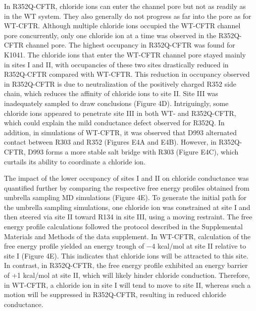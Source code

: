 In R352Q-CFTR, chloride ions can enter the channel pore but not as readily as in the WT system. They also generally do not progress as far into the pore as for WT-CFTR. Although multiple chloride ions occupied the WT-CFTR channel pore concurrently, only one chloride ion at a time was observed in the R352Q-CFTR channel pore. The highest occupancy in R352Q-CFTR was found for K1041. The chloride ions that enter the WT-CFTR channel pore stayed mainly in sites I and II, with occupancies of these two sites drastically reduced in R352Q-CFTR compared with WT-CFTR. This reduction in occupancy observed in R352Q-CFTR is due to neutralization of the positively charged R352 side chain, which reduces the affinity of chloride ions to site II. Site III was inadequately sampled to draw conclusions (Figure 4D). Intriguingly, some chloride ions appeared to penetrate site III in both WT- and R352Q-CFTR, which could explain the mild conductance defect observed for R352Q. In addition, in simulations of WT-CFTR, it was observed that D993 alternated contact between R303 and R352 (Figures E4A and E4B). However, in R352Q-CFTR, D993 forms a more stable salt bridge with R303 (Figure E4C), which curtails its ability to coordinate a chloride ion.

The impact of the lower occupancy of sites I and II on chloride conductance was quantified further by comparing the respective free energy profiles obtained from umbrella sampling MD simulations (Figure 4E). To generate the initial path for the umbrella sampling simulations, one chloride ion was constrained at site I and then steered via site II toward R134 in site III, using a moving restraint. The free energy profile calculations followed the protocol described in the Supplemental Materials and Methods of the data supplement. In WT-CFTR, calculation of the free energy profile yielded an energy trough of −4 kcal/mol at site II relative to site I (Figure 4E). This indicates that chloride ions will be attracted to this site. In contrast, in R352Q-CFTR, the free energy profile exhibited an energy barrier of +1 kcal/mol at site II, which will likely hinder chloride conduction. Therefore, in WT-CFTR, a chloride ion in site I will tend to move to site II, whereas such a motion will be suppressed in R352Q-CFTR, resulting in reduced chloride conductance.

